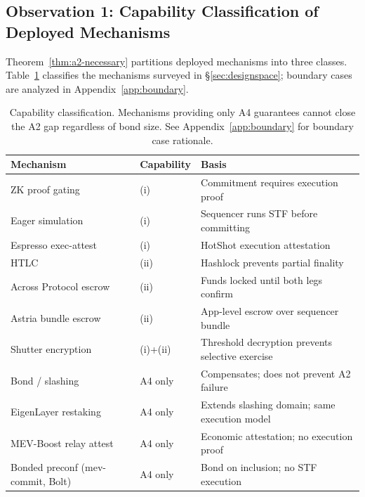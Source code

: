 
\subsection{Observation 1: Capability Classification of Deployed Mechanisms}
\label{sec:obs1}

Theorem~\ref{thm:a2-necessary} partitions deployed mechanisms into three classes.
Table~\ref{tab:capability-class} classifies the mechanisms surveyed in
\S\ref{sec:designspace}; boundary cases are analyzed in Appendix~\ref{app:boundary}.

\begin{table}[h]
\centering
\small
\caption{Capability classification. Mechanisms providing only A4 guarantees
  cannot close the A2 gap regardless of bond size. See Appendix~\ref{app:boundary}
  for boundary case rationale.}
\label{tab:capability-class}
\begin{tabular}{@{}lll@{}}
\toprule
Mechanism & Capability & Basis \\
\midrule
ZK proof gating           & (i)       & Commitment requires execution proof \\
Eager simulation          & (i)       & Sequencer runs STF before committing \\
Espresso exec-attest      & (i)       & HotShot execution attestation \\
HTLC                      & (ii)      & Hashlock prevents partial finality \\
Across Protocol escrow    & (ii)      & Funds locked until both legs confirm \\
Astria bundle escrow      & (ii)      & App-level escrow over sequencer bundle \\
Shutter encryption        & (i)+(ii)  & Threshold decryption prevents selective exercise \\
Bond / slashing           & A4 only   & Compensates; does not prevent A2 failure \\
EigenLayer restaking      & A4 only   & Extends slashing domain; same execution model \\
MEV-Boost relay attest    & A4 only   & Economic attestation; no execution proof \\
Bonded preconf (mev-commit, Bolt) & A4 only & Bond on inclusion; no STF execution \\
\bottomrule
\end{tabular}
\end{table}

